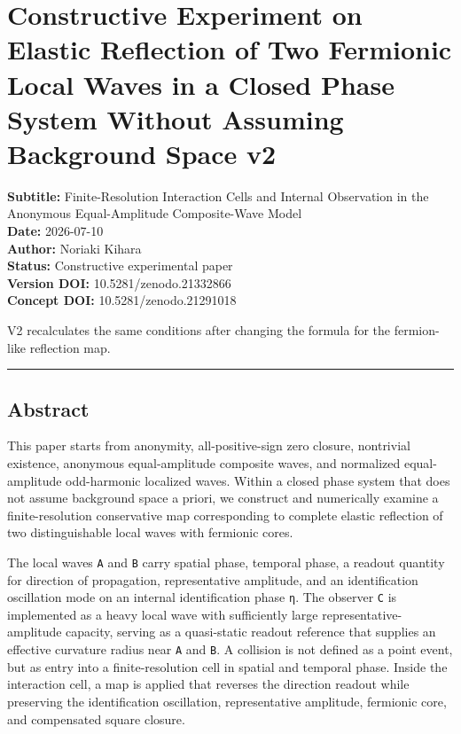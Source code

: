 \documentclass[
  a4paper,
]{article}
\author{}
\date{}
\begin{document}
\section{Constructive Experiment on Elastic Reflection of Two Fermionic
Local Waves in a Closed Phase System Without Assuming Background Space
v2}\label{constructive-experiment-on-elastic-reflection-of-two-fermionic-local-waves-in-a-closed-phase-system-without-assuming-background-space-v2}

\textbf{Subtitle:} Finite-Resolution Interaction Cells and Internal
Observation in the Anonymous Equal-Amplitude Composite-Wave Model\\
\textbf{Date:} 2026-07-10\\
\textbf{Author:} Noriaki Kihara\\
\textbf{Status:} Constructive experimental paper\\
\textbf{Version DOI:} 10.5281/zenodo.21332866\\
\textbf{Concept DOI:} 10.5281/zenodo.21291018

V2 recalculates the same conditions after changing the formula for the
fermion-like reflection map.

\begin{center}\rule{0.5\linewidth}{0.5pt}\end{center}

\subsection{Abstract}\label{abstract}

This paper starts from anonymity, all-positive-sign zero closure,
nontrivial existence, anonymous equal-amplitude composite waves, and
normalized equal-amplitude odd-harmonic localized waves. Within a closed
phase system that does not assume background space a priori, we
construct and numerically examine a finite-resolution conservative map
corresponding to complete elastic reflection of two distinguishable
local waves with fermionic cores.

The local waves \texttt{A} and \texttt{B} carry spatial phase, temporal
phase, a readout quantity for direction of propagation, representative
amplitude, and an identification oscillation mode on an internal
identification phase \texttt{η}. The observer \texttt{C} is implemented
as a heavy local wave with sufficiently large representative-amplitude
capacity, serving as a quasi-static readout reference that supplies an
effective curvature radius near \texttt{A} and \texttt{B}. A collision
is not defined as a point event, but as entry into a finite-resolution
cell in spatial and temporal phase. Inside the interaction cell, a map
is applied that reverses the direction readout while preserving the
identification oscillation, representative amplitude, fermionic core,
and compensated square closure.
\end{document}
